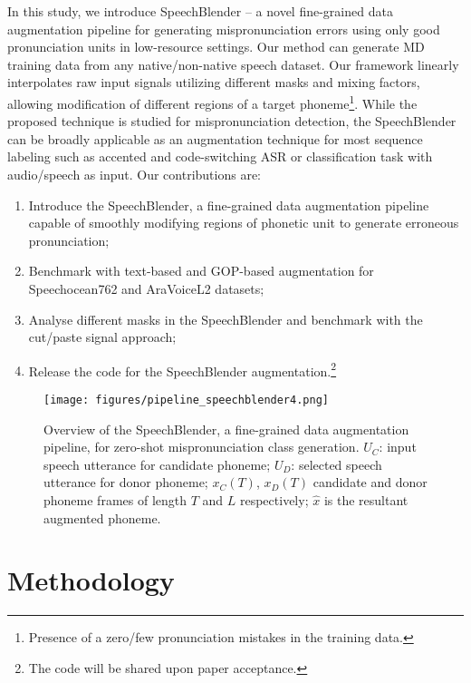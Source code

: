 \documentclass{INTERSPEECH2023}
\begin{document}
In this study, we introduce SpeechBlender – a novel fine-grained data augmentation pipeline for generating mispronunciation errors using only good pronunciation units in low-resource settings. Our method can generate MD training data from any native/non-native speech dataset. Our framework linearly interpolates raw input signals utilizing different masks and mixing factors, allowing modification of different regions of a target phoneme\footnote{Presence of a zero/few pronunciation mistakes in the training data.}. While the proposed technique is studied for mispronunciation detection, the SpeechBlender can be broadly applicable as an augmentation technique for most sequence labeling such as accented and code-switching ASR or classification task with audio/speech as input.
Our contributions are:
\vspace{-0.1cm}
\setlength\itemsep{-0.5em}
\begin{enumerate}[label=(\alph*)]
\item Introduce the SpeechBlender, a fine-grained data augmentation pipeline capable of smoothly modifying regions of phonetic unit to generate erroneous pronunciation; 
\item Benchmark with text-based and GOP-based augmentation for Speechocean762 and AraVoiceL2 datasets;
\item Analyse different masks in the SpeechBlender and benchmark with the cut/paste signal approach;
\item Release the code for the SpeechBlender augmentation.\footnote{The code will be shared upon paper acceptance.}
\end{enumerate}






\begin{figure}[!ht]
\centering
\texttt{[image: figures/pipeline\_speechblender4.png]}
\caption{Overview of the SpeechBlender, a fine-grained data augmentation pipeline, for zero-shot mispronunciation class generation. $U_C$: input speech utterance for candidate phoneme; $U_D$: selected speech utterance for donor phoneme; $x_C(T)$, $x_D(T)$ candidate and donor phoneme frames of length $T$ and $L$ respectively; $\hat{x}$ is the resultant augmented phoneme.}
\label{fig:data_aug_pipeline}
\end{figure}

\section{Methodology} 
\label{sec:method}
\end{document}
